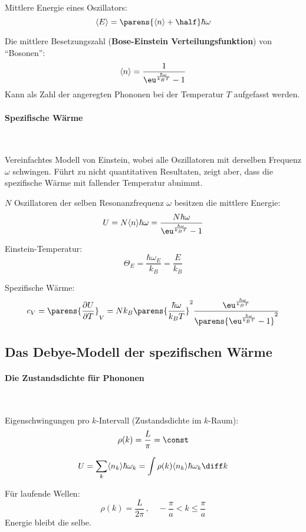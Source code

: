 			Mittlere Energie eines Oszillators:
			\[
				\langle E \rangle = \parens{\langle n \rangle + \half} \hbar \omega
			\]

			Die mittlere Besetzungszahl (\textbf{Bose-Einstein Verteilungsfunktion})
			von ``Bosonen'':
			\[
				\langle n \rangle = \frac{1}{\eu^{\frac{\hbar\omega}{k_B T}} - 1}
			\]
			Kann als Zahl der angeregten Phononen bei der Temperatur $T$ aufgefasst werden.
		\paragraph{Spezifische Wärme} %
			~
			
			Vereinfachtes Modell von Einstein, wobei alle Oszillatoren mit derselben
			Frequenz $\omega$ schwingen. Führt zu nicht quantitativen Resultaten,
			zeigt aber, dass die spezifische Wärme mit fallender Temperatur abnimmt.
			
			$N$ Oszillatoren der selben Resonanzfrequenz $\omega$ besitzen die
			mittlere Energie:
			\[
				U = N \langle n \rangle \hbar \omega =
					\frac{N \hbar \omega}{\eu^{\frac{\hbar\omega}{k_B T}} - 1}
			\]

			Einstein-Temperatur:
			\[
				\Theta_E = \frac{\hbar \omega_E}{k_B} = \frac{E}{k_B}
			\]
			
			Spezifische Wärme:
			\[
				c_V = \parens{\frac{\partial U}{\partial T}}_V = N k_B  \parens{\frac{\hbar\omega}{k_B T}}^2 \frac{\eu^{\frac{\hbar\omega}{k_B T}}}{\parens{\eu^{\frac{\hbar\omega}{k_B T}} - 1}^2}
			\]
	\subsection{Das Debye-Modell der spezifischen Wärme} %
		\paragraph{Die Zustandsdichte für Phononen} %
			~
			
			Eigenschwingungen pro $k$-Intervall (Zustandsdichte im $k$-Raum):
			\[
				\rho (k) = \frac L \pi = \const
			\]
			
			\[
				U = \sum_k \langle n_k \rangle \hbar \omega_k = \int \rho(k) \langle n_k \rangle \hbar \omega_k \diff k
			\]
			
			Für laufende Wellen:
			\[
				\rho(k) = \frac L {2\pi} \,,\quad -\frac \pi a < k \le \frac \pi a
			\]
			Energie bleibt die selbe.
			
